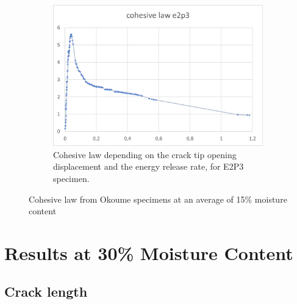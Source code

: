 \begin{figure}[H]
\begin{subfigure}{0.48\linewidth}
	\includegraphics[scale=0.6]{Figures/e2p3_colaw}
	\decoRule
	\caption[Cohesive law from E2P3 specimen]{Cohesive law depending on the crack tip opening displacement and the energy release rate, for E2P3 specimen.}
	\label{fig:E2P3_colaw}
\end{subfigure}
\caption{Cohesive law from Okoume specimens at an average of 15\% moisture content}
\label{E2p_colaw}
\end{figure}
\newpage

\section{Results at 30\% Moisture Content}

\subsection{Crack length}

